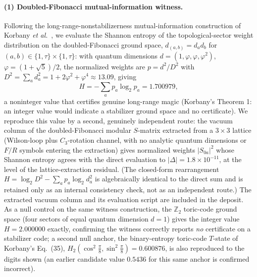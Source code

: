 \documentclass[aps,pra,twocolumn,superscriptaddress,longbibliography,floatfix,nofootinbib]{revtex4-2}
\begin{document}
\paragraph{(1) Doubled-Fibonacci mutual-information witness.} Following
the long-range-nonstabilizerness mutual-information construction of
Korbany \emph{et al.}~\cite{Korbany2026}, we evaluate the Shannon
entropy of the topological-sector weight distribution on the
doubled-Fibonacci ground space, $d_{(a,b)}=d_a d_b$ for
$(a,b)\in\{1,\tau\}\times\{1,\tau\}$: with quantum dimensions
$d=(1,\varphi,\varphi,\varphi^2)$, $\varphi=(1+\sqrt5)/2$, the
normalized weights are $p=d^2/D^2$ with
$D^2=\sum_a d_a^2=1+2\varphi^2+\varphi^4\approx13.09$, giving
\begin{equation}
H = -\sum_a p_a\log_2 p_a = 1.700979,
\end{equation}
a noninteger value that certifies genuine long-range magic (Korbany's
Theorem 1: an integer value would indicate a stabilizer ground space
and no certificate). We reproduce this value by a second, genuinely
independent route: the vacuum column of the doubled-Fibonacci modular
$S$-matrix extracted from a $3\times3$ lattice (Wilson-loop plus
$C_3$-rotation channel, with no analytic quantum dimensions or $F/R$
symbols entering the extraction) gives normalized weights
$\lvert S_{0a}\rvert^2$ whose Shannon entropy agrees with the direct
evaluation to $\lvert\Delta\rvert=1.8\times10^{-11}$, at the level of
the lattice-extraction residual. (The closed-form rearrangement
$H=\log_2 D^2-\sum_a p_a\log_2 d_a^2$ is algebraically identical to the
direct sum and is retained only as an internal consistency check, not
as an independent route.) The extracted vacuum column and its
evaluation script are included in the deposit. As a null control on the same
witness construction, the $\mathbb{Z}_2$ toric-code ground space
(four sectors of equal quantum dimension $d=1$) gives the integer
value $H=2.000000$ exactly, confirming the witness correctly reports
\emph{no} certificate on a stabilizer code; a second null anchor, the
binary-entropy toric-code $T$-state of Korbany's Eq.~(35),
$H_2(\cos^2\tfrac\pi8,\sin^2\tfrac\pi8)=0.600876$, is also reproduced
to the digits shown (an earlier candidate value $0.5436$ for this same
anchor is confirmed incorrect).
\end{document}
